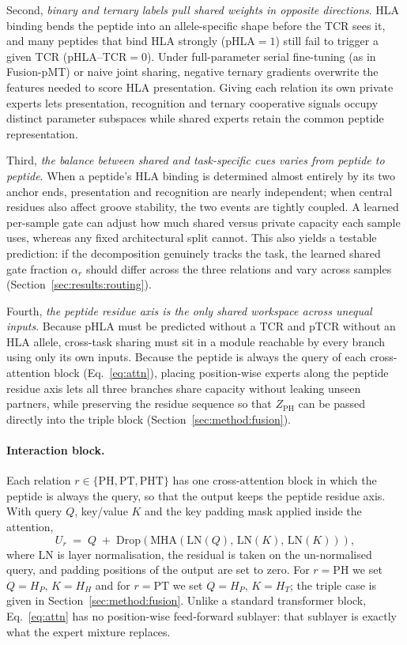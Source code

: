 \documentclass[webpdf,modern,large,namedate]{oup-authoring-template}
\theoremstyle{thmstyleone}
\theoremstyle{thmstyletwo}
\theoremstyle{thmstylethree}
\newcommand{\PH}{pHLA}
\newcommand{\PT}{pTCR}
\newcommand{\PHT}{pHLA--TCR}
\newcommand{\PHm}{\mathrm{PH}}
\newcommand{\PTm}{\mathrm{PT}}
\newcommand{\PHTm}{\mathrm{PHT}}
\newcommand{\LN}{\mathrm{LN}}
\newcommand{\MHA}{\mathrm{MHA}}
\begin{document}
Second, \emph{binary and ternary labels pull shared weights in opposite
directions}. HLA binding bends the peptide into an allele-specific shape before
the TCR sees it, and many peptides that bind HLA strongly (\PH{}$=1$) still
fail to trigger a given TCR (\PHT{}$=0$). Under full-parameter serial
fine-tuning (as in Fusion-pMT) or naive joint sharing, negative ternary
gradients overwrite the features needed to score HLA presentation. Giving each
relation its own private experts lets presentation, recognition and ternary
cooperative signals occupy distinct parameter subspaces while shared experts
retain the common peptide representation.

Third, \emph{the balance between shared and task-specific cues varies from
peptide to peptide}. When a peptide's HLA binding is determined almost entirely
by its two anchor ends, presentation and recognition are nearly independent;
when central residues also affect groove stability, the two events are tightly
coupled. A learned per-sample gate can adjust how much shared versus private
capacity each sample uses, whereas any fixed architectural split cannot. This
also yields a testable prediction: if the decomposition genuinely tracks the
task, the learned shared gate fraction $\alpha_r$ should differ across the
three relations and vary across samples (Section~\ref{sec:results:routing}).

Fourth, \emph{the peptide residue axis is the only shared workspace across
unequal inputs}. Because \PH{} must be predicted without a TCR and \PT{}
without an HLA allele, cross-task sharing must sit in a module reachable by
every branch using only its own inputs. Because the peptide is always the query
of each cross-attention block (Eq.~\eqref{eq:attn}), placing position-wise
experts along the peptide residue axis lets all three branches share capacity
without leaking unseen partners, while preserving the residue sequence so that
$Z_{\PHm}$ can be passed directly into the triple block
(Section~\ref{sec:method:fusion}).

\paragraph{Interaction block.}
Each relation $r\in\{\PHm,\PTm,\PHTm\}$ has one cross-attention block in
which the peptide is always the query, so that the output keeps the peptide
residue axis. With query $Q$, key/value $K$ and the key padding mask applied
inside the attention,
\begin{equation}
U_r \;=\; Q \;+\; \mathrm{Drop}\!\left(\MHA\!\left(\LN(Q),\,\LN(K),\,\LN(K)\right)\right),
\label{eq:attn}
\end{equation}
where $\LN$ is layer normalisation, the residual is taken on the
un-normalised query, and padding positions of the output are set to zero. For
$r=\PHm$ we set $Q=H_P,\,K=H_H$ and for $r=\PTm$ we set $Q=H_P,\,K=H_T$; the
triple case is given in Section~\ref{sec:method:fusion}. Unlike a standard
transformer block, Eq.~\eqref{eq:attn} has no position-wise feed-forward
sublayer: that sublayer is exactly what the expert mixture replaces.
\end{document}
